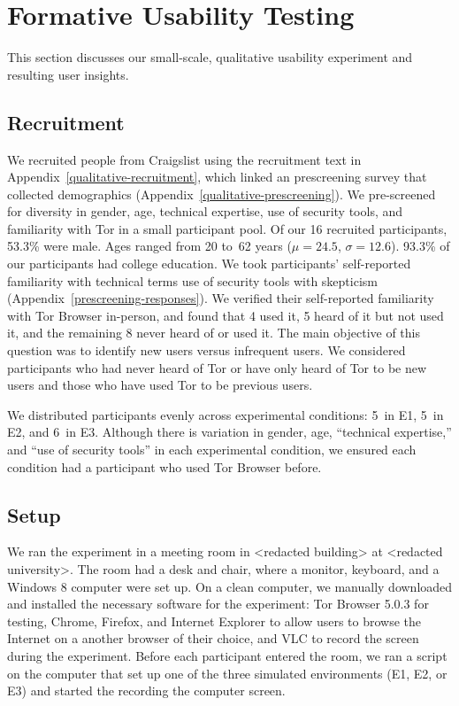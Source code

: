 \documentclass[USenglish,oneside,twocolumn]{article}
\begin{document}
\section{Formative Usability Testing}
\label{sec:qualitative}
This section discusses our small-scale, qualitative usability experiment and resulting user insights. 

\subsection{Recruitment}
We recruited people from Craigslist using the recruitment text in Appendix~\ref{qualitative-recruitment}, which linked an prescreening survey that collected demographics (Appendix~\ref{qualitative-prescreening}). We pre-screened~\cite{screening} for diversity in gender, age, technical expertise, use of security tools, and familiarity with Tor in a small participant pool. {\color {red} Of our 16 recruited participants, 53.3\% were male. Ages ranged from 20 to~62 years ($\mu = 24.5$, $\sigma = 12.6$). 93.3\% of our participants had college education.} We took participants' self-reported familiarity with technical terms use of security tools with skepticism (Appendix~\ref{prescreening-responses}). We verified their self-reported familiarity with Tor Browser in-person, and found that 4 used it, 5 heard of it but not used it, and the remaining 8 never heard of or used it. The main objective of this question was to identify new users versus infrequent users. We considered participants who had never heard of Tor or have only heard of Tor to be new users and those who have used Tor to be previous users. 

We distributed participants evenly across experimental conditions:  5~in E1, 5~in E2, and 6~in E3. Although there is variation in gender, age, ``technical expertise,'' and ``use of security tools'' in each experimental condition, we ensured each condition had a participant who used Tor Browser before. 

\subsection{Setup} 
We ran the experiment in a meeting room in <redacted building> at <redacted university>. The room had a desk and chair, where a monitor, keyboard, and a Windows 8 computer were set up. On a clean computer, we manually downloaded and installed the necessary software for the experiment: Tor Browser 5.0.3 for testing, Chrome, Firefox, and Internet Explorer to allow users to browse the Internet on a another browser of their choice, and VLC to record the screen during the experiment. Before each participant entered the room, we ran a script on the computer that
set up one of the three simulated environments (E1, E2, or E3) and started the recording the computer screen.  
\end{document}
